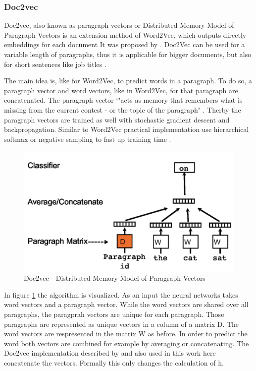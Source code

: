 \documentclass[12pt, a4paper, titlepage]{article}
\begin{document}
\subsubsection{Doc2vec}
Doc2vec, also known as paragraph vectors or Distributed Memory Model of Paragraph Vectors is an extension method of Word2Vec, which outputs directly embeddings for each document \citep{lau2016} It was proposed by \cite{le2014}. Doc2Vec can be used for a variable length of paragraphs, thus it is applicable for bigger documents, but also for short sentences like job titles \citep{le2014}. 

The main idea is, like for Word2Vec, to predict words in a paragraph. To do so, a paragraph vector and word vectors, like in Word2Vec, for that paragraph are concatenated. The paragraph vector `"acts as memory that remembers what is missing from the current contest - or the topic of the paragraph" \citep[3]{le2014}. Therby the paragraph vectors are trained as well with stochastic gradient descent and backpropagation. Similar to Word2Vec practical implementation use hierarchical softmax or negative sampling to fast up training time \citep{lau2016}. 

\begin{figure}[hb!]
  \center
  \includegraphics[scale=0.5]{doc2vec.png}
  \caption{\label{fig: F2} Doc2vec - Distributed Memory Model of Paragraph Vectors \citep[3]{le2014}}
\end{figure}

In figure \ref{fig: F2} the algorithm is visualized. As an input the neural networks takes word vectors and a paragraph vector. While the word vectors are shared over all paragraphs, the paragprah vectors are unique for each paragraph. Those paragraphs are represented as unique vectors in a column of a matrix D. The word vectors are respresented in the matrix W as before. In order to predict the word both vectors are combined for example by averaging or concatenating. The Doc2vec implementation described by \citet{le2014} and also used in this work here concatenate the vectors. Formally this only changes the calculation of h. \citep{lau2016}
\end{document}
